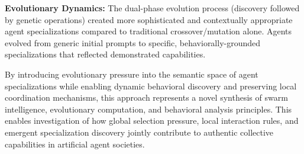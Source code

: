 \textbf{Evolutionary Dynamics:} The dual-phase evolution process (discovery followed by genetic operations) created more sophisticated and contextually appropriate agent specializations compared to traditional crossover/mutation alone. Agents evolved from generic initial prompts to specific, behaviorally-grounded specializations that reflected demonstrated capabilities.

By introducing evolutionary pressure into the semantic space of agent specializations while enabling dynamic behavioral discovery and preserving local coordination mechanisms, this approach represents a novel synthesis of swarm intelligence, evolutionary computation, and behavioral analysis principles. This enables investigation of how global selection pressure, local interaction rules, and emergent specialization discovery jointly contribute to authentic collective capabilities in artificial agent societies.
